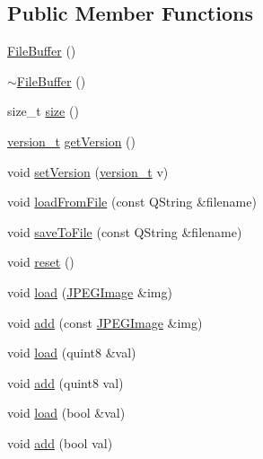 \subsection*{Public Member Functions}
\begin{DoxyCompactItemize}
\item 
\hyperlink{classShipCAD_1_1FileBuffer_ab243cfcb8a68ce791103594e974ee9ba}{File\-Buffer} ()
\item 
\hyperlink{classShipCAD_1_1FileBuffer_a397c9a755598f9939eb30460b605d44c}{$\sim$\-File\-Buffer} ()
\item 
size\-\_\-t \hyperlink{classShipCAD_1_1FileBuffer_a51dc1007457d999ce374afd6a6ae29f8}{size} ()
\item 
\hyperlink{namespaceShipCAD_af3a6fa23a7318acbda7b0066b53d694f}{version\-\_\-t} \hyperlink{classShipCAD_1_1FileBuffer_a06f87b30f5fd091cc5c270964ea16770}{get\-Version} ()
\item 
void \hyperlink{classShipCAD_1_1FileBuffer_a66c14f8f21b9f77febd154aee9565f0b}{set\-Version} (\hyperlink{namespaceShipCAD_af3a6fa23a7318acbda7b0066b53d694f}{version\-\_\-t} v)
\item 
void \hyperlink{classShipCAD_1_1FileBuffer_a7d5d6ac5aa85545999186f4745a77093}{load\-From\-File} (const Q\-String \&filename)
\item 
void \hyperlink{classShipCAD_1_1FileBuffer_a175d7a153228b5cba5db062a2afd5026}{save\-To\-File} (const Q\-String \&filename)
\item 
void \hyperlink{classShipCAD_1_1FileBuffer_af59c26297994b38aabc4bc678d04c246}{reset} ()
\item 
void \hyperlink{classShipCAD_1_1FileBuffer_a86223c54bcf111ef205c9d651e0b9a66}{load} (\hyperlink{structShipCAD_1_1JPEGImage}{J\-P\-E\-G\-Image} \&img)
\item 
void \hyperlink{classShipCAD_1_1FileBuffer_a9a5d46b2c6d568ee2cdef110d4773e73}{add} (const \hyperlink{structShipCAD_1_1JPEGImage}{J\-P\-E\-G\-Image} \&img)
\item 
void \hyperlink{classShipCAD_1_1FileBuffer_ab196d459581b5c877ebea2f567e9bda8}{load} (quint8 \&val)
\item 
void \hyperlink{classShipCAD_1_1FileBuffer_afb11c583e5d3a7a580e5f88004d6c7e3}{add} (quint8 val)
\item 
void \hyperlink{classShipCAD_1_1FileBuffer_ad1aebcc97e364569934c66eec5a87485}{load} (bool \&val)
\item 
void \hyperlink{classShipCAD_1_1FileBuffer_a7cb4395eae7ffa405290c3bed9890bee}{add} (bool val)
\item 

\end{DoxyCompactItemize}
